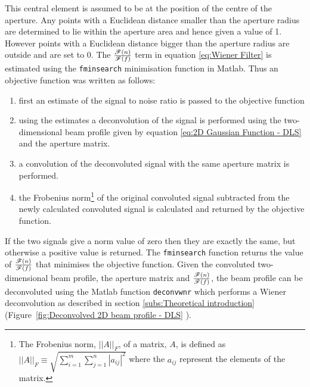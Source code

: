 This central element is assumed to be at the position of the centre of the aperture.
Any points with a Euclidean distance smaller than the aperture radius are determined to lie within the aperture area and hence given a value of 1.
However points with a Euclidean distance bigger than the aperture radius are outside and are set to 0.
\newline
The $\frac{\mathscr{F}(n)}{\mathscr{F}(f)}$ term in equation \ref{eq:Wiener Filter} is estimated using the \verb+fminsearch+ minimisation function in Matlab.
Thus an objective function was written as follows:
\begin{enumerate}
    \item first an estimate of the signal to noise ratio is passed to the objective function
    \item using the estimates a deconvolution of the signal is performed using the two-dimensional beam profile given by equation \ref{eq:2D Gaussian Function - DLS} and the aperture matrix.
    \item a convolution of the deconvoluted signal with the same aperture matrix is performed.
    \item the Frobenius norm\footnote{The Frobenius norm, $||A||_F$, of a matrix, $A$, is defined as $||A||_F \equiv \sqrt{\sum_{i=1}^{m} \sum_{j=1}^{n} |a_{ij}|^2}$ where the $a_{ij}$ represent the elements of the matrix.} of the original convoluted signal subtracted from the newly calculated convoluted signal is calculated and returned by the objective function.
\end{enumerate}
If the two signals give a norm value of zero then they are exactly the same, but otherwise a positive value is returned.
The \verb+fminsearch+ function returns the value of $\frac{\mathscr{F}(n)}{\mathscr{F}(f)}$ that minimises the objective function.
Given the convoluted two-dimensional beam profile, the aperture matrix and $\frac{\mathscr{F}(n)}{\mathscr{F}(f)}$, the beam profile can be deconvoluted using the Matlab function \verb+deconvwnr+ which performs a Wiener deconvolution as described in section \ref{subs:Theoretical introduction} (Figure~\ref{fig:Deconvolved 2D beam profile - DLS} ).
